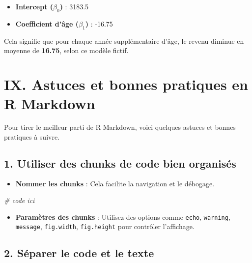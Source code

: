 \documentclass[
]{article}
\newenvironment{Shaded}{\begin{snugshade}}{\end{snugshade}}
\newcommand{\CommentTok}[1]{\textcolor[rgb]{0.56,0.35,0.01}{\textit{#1}}}
\providecommand{\tightlist}{%
  \setlength{\itemsep}{0pt}\setlength{\parskip}{0pt}}
\begin{document}
\begin{itemize}
\tightlist
\item
  \textbf{Intercept (\(\beta_0\))} : 3183.5
\item
  \textbf{Coefficient d'âge (\(\beta_1\))} : -16.75
\end{itemize}

Cela signifie que pour chaque année supplémentaire d'âge, le revenu
diminue en moyenne de \textbf{16.75}, selon ce modèle fictif.

\hypertarget{ix.-astuces-et-bonnes-pratiques-en-r-markdown}{%
\section{IX. Astuces et bonnes pratiques en R
Markdown}\label{ix.-astuces-et-bonnes-pratiques-en-r-markdown}}

Pour tirer le meilleur parti de R Markdown, voici quelques astuces et
bonnes pratiques à suivre.

\hypertarget{utiliser-des-chunks-de-code-bien-organisuxe9s}{%
\subsection{1. Utiliser des chunks de code bien
organisés}\label{utiliser-des-chunks-de-code-bien-organisuxe9s}}

\begin{itemize}
\tightlist
\item
  \textbf{Nommer les chunks} : Cela facilite la navigation et le
  débogage.
\end{itemize}

\begin{Shaded}
\begin{Highlighting}[]
  \CommentTok{\# code ici}
\end{Highlighting}
\end{Shaded}

\begin{itemize}
\tightlist
\item
  \textbf{Paramètres des chunks} : Utilisez des options comme
  \texttt{echo}, \texttt{warning}, \texttt{message}, \texttt{fig.width},
  \texttt{fig.height} pour contrôler l'affichage.
\end{itemize}

\hypertarget{suxe9parer-le-code-et-le-texte}{%
\subsection{2. Séparer le code et le
texte}\label{suxe9parer-le-code-et-le-texte}}
\end{document}
